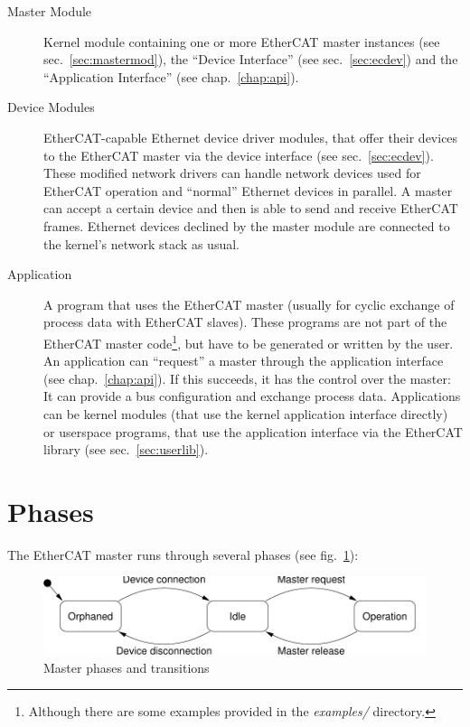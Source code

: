 \documentclass[a4paper,12pt,BCOR6mm,bibtotoc,idxtotoc]{scrbook}
\begin{document}
\begin{description}

\item[Master Module] Kernel module containing one or more
EtherCAT master instances (see sec.~\ref{sec:mastermod}), the ``Device
Interface'' (see sec.~\ref{sec:ecdev}) and the ``Application Interface'' (see
chap.~\ref{chap:api}).

\item[Device Modules] EtherCAT-capable Ethernet device
driver modules, that offer their devices to the EtherCAT
master via the device interface (see sec.~\ref{sec:ecdev}). These modified
network drivers can handle network devices used for EtherCAT operation and
``normal'' Ethernet devices in parallel. A master can accept a certain device
and then is able to send and receive EtherCAT frames. Ethernet devices
declined by the master module are connected to the kernel's network stack as
usual.

\item[Application] A program that uses the EtherCAT master
(usually for cyclic exchange of process data with EtherCAT slaves). These
programs are not part of the EtherCAT master code\footnote{Although there are
some examples provided in the \textit{examples/} directory.}, but have to be
generated or written by the user. An application can ``request'' a master
through the application interface (see chap.~\ref{chap:api}). If this
succeeds, it has the control over the master: It can provide a bus
configuration and exchange process data.  Applications can be kernel modules
(that use the kernel application interface directly) or userspace programs,
that use the application interface via the EtherCAT library (see
sec.~\ref{sec:userlib}).

\end{description}


\section{Phases}

The EtherCAT master runs through several phases (see fig.~\ref{fig:phases}):

\begin{figure}[htbp]
  \centering
  \includegraphics[width=.9\textwidth]{images/phases}
  \caption{Master phases and transitions}
  \label{fig:phases}
\end{figure}
\end{document}
